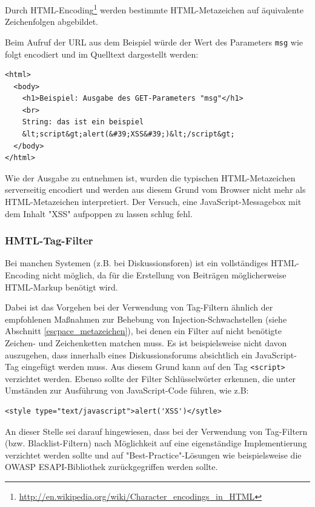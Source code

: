 Durch HTML-Encoding\footnote{\url{http://en.wikipedia.org/wiki/Character\_encodings\_in\_HTML}} 
werden bestimmte HTML-Metazeichen auf äquivalente Zeichenfolgen abgebildet.

Beim Aufruf der URL aus dem Beispiel würde der Wert des Parameters 
\texttt{msg} wie folgt encodiert und im Quelltext dargestellt werden:

\begin{lstlisting}[basicstyle=\ttfamily\footnotesize]
<html>
  <body>
    <h1>Beispiel: Ausgabe des GET-Parameters "msg"</h1>
    <br>
    String: das ist ein beispiel
    &lt;script&gt;alert(&#39;XSS&#39;)&lt;/script&gt;
  </body>
</html>
\end{lstlisting}

Wie der Ausgabe zu entnehmen ist, wurden die typischen HTML-Metazeichen 
serverseitig encodiert und werden aus diesem Grund vom Browser nicht 
mehr als HTML-Metazeichen interpretiert. Der Versuch, eine JavaScript-Messagebox 
mit dem Inhalt "XSS" aufpoppen zu lassen schlug fehl.

\subsubsection{HMTL-Tag-Filter}

Bei manchen Systemen (z.B. bei Diskussionsforen) ist ein vollständiges 
HTML-Encoding nicht möglich, da für die Erstellung von Beiträgen 
möglicherweise HTML-Markup benötigt wird. 

Dabei ist das Vorgehen bei der Verwendung von Tag-Filtern ähnlich der 
empfohlenen Maßnahmen zur Behebung von Injection-Schwachstellen 
(siehe Abschnitt \ref{escpace_metazeichen}), bei denen ein Filter auf 
nicht benötigte Zeichen- und Zeichenketten matchen muss. Es ist 
beispielsweise nicht davon auszugehen, dass innerhalb eines 
Diskussionsforums absichtlich ein JavaScript-Tag eingefügt werden 
muss. Aus diesem Grund kann auf den Tag \texttt{<script>} verzichtet 
werden. Ebenso sollte der Filter Schlüsselwörter erkennen, die unter 
Umständen zur Ausführung von JavaScript-Code führen, wie z.B:

\begin{lstlisting}[basicstyle=\ttfamily\footnotesize]
<style type="text/javascript">alert('XSS')</sytle>
\end{lstlisting}

An dieser Stelle sei darauf hingewiesen, dass bei der Verwendung von 
Tag-Filtern (bzw. Blacklist-Filtern) nach Möglichkeit auf eine 
eigenständige Implementierung verzichtet werden sollte und auf 
"Best-Practice"-Lösungen wie beispielsweise die OWASP 
ESAPI-Bibliothek zurückgegriffen werden sollte.

